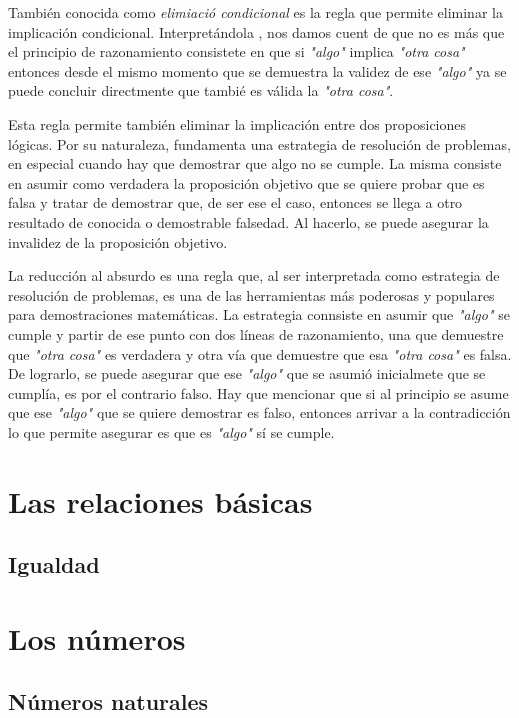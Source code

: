 También conocida como \textit{elimiació condicional} es la regla que permite eliminar la implicación condicional. Interpretándola , nos damos cuent de que no es más que el principio de razonamiento consistete en que si \textit{"algo"} implica \textit{"otra cosa"} entonces desde el mismo momento que se demuestra la validez de ese \textit{"algo"} ya se puede concluir directmente que tambié es válida la \textit{"otra cosa"}.



Esta regla permite también eliminar la implicación entre dos proposiciones lógicas. Por su naturaleza, fundamenta una estrategia de resolución de problemas, en especial cuando hay que demostrar que algo no se cumple. La misma consiste en asumir como verdadera la proposición objetivo que se quiere probar que es falsa y tratar de demostrar que, de ser ese el caso, entonces se llega a otro resultado de conocida o demostrable falsedad. Al hacerlo, se puede asegurar la invalidez de la proposición objetivo.



La reducción al absurdo es una regla que, al ser interpretada como estrategia de resolución de problemas, es una de las herramientas más poderosas y populares para demostraciones matemáticas. La estrategia connsiste en asumir que \textit{"algo"} se cumple y partir de ese punto con dos líneas de razonamiento, una que demuestre que \textit{"otra cosa"} es verdadera y otra vía que demuestre que esa \textit{"otra cosa"} es falsa. De lograrlo, se puede asegurar que ese \textit{"algo"} que se asumió inicialmete que se cumplía, es por el contrario falso. Hay que mencionar que si al principio se asume que ese \textit{"algo"} que se quiere demostrar es falso, entonces arrivar a la contradicción lo que permite asegurar es que es \textit{"algo"} sí se cumple.

\section{Las relaciones básicas}
\subsection{Igualdad}




\section{Los números}
\subsection{Números naturales}



